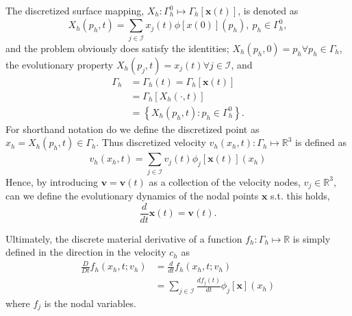 The discretized surface mapping, $X_{h}: \Gamma_{h} ^{0} \mapsto  \Gamma _{h} \left[ \mathbf{x}\left( t \right)  \right] $, is denoted as \[
X_{h}\left( p_{h},t \right) = \sum_{j \in \mathcal{I} }^{}  x_{j}\left( t \right)  \phi \left[ x\left( 0 \right)  \right] \left( p_{h} \right), \  p_{h} \in \Gamma ^{0}_{h},
\]
and the problem obviously does satisfy the identities; $X_{h}\left( p_{h},0 \right)  = p_{h} \forall p_{h} \in \Gamma _{h}$, the evolutionary property $X_{h} \left( p_{j}, t \right)  = x_{j}\left( t \right)  \forall j \in \mathcal{I} $, and
\[
    \begin{split}
        \Gamma _{h} & = \Gamma_{h} \left( t \right) =   \Gamma_{h} \left[ \mathbf{x}\left( t \right)  \right]  \\
                                    &= \Gamma_{h}\left[ X_{h}\left( \cdot ,t \right)  \right] \\
&=\left\{ X_{h}\left( p_{h},t \right): p_{h} \in  \Gamma ^{0}_{h} \right\}.
    \end{split}
\]
For shorthand notation do we define the discretized point as $x_{h} = X_{h}\left( p_{h},t \right) \in \Gamma _{h} $.
Thus discretized velocity $v_{h}\left( x_{h},t \right): \Gamma _{h} \mapsto  \mathbb{R} ^{3} $ is defined as \[
    v_{h}\left( x_{h},t \right)  = \sum_{j \in \mathcal{I} }^{} v_{j}\left( t \right) \phi _{j}\left[ \mathbf{x}\left( t \right)  \right] \left( x_{h} \right)
\]
Hence, by introducing  $\mathbf{v} = \mathbf{v}\left( t \right)  $ as a collection of the velocity nodes,  $v_{j} \in \mathbb{R} ^3$, can we define the evolutionary dynamics of the nodal points $\mathbf{x}$ s.t. this holds,
\[
\frac{d}{dt}\mathbf{x}\left( t \right) = \mathbf{v}\left( t \right).
\]

Ultimately, the discrete material derivative of a function $f_{h}: \Gamma _{h} \mapsto  \mathbb{R} $ is simply defined in the direction in the velocity $c_{h}$  as \[
    \begin{split}
\frac{D}{Dt}f_{h}\left( x_{h}, t; v_{h}   \right) & = \frac{d}{dt} f_{h}\left( x_{h}, t; v_{h}   \right) \\
 & = \sum_{j \in \mathcal{I} }^{} \frac{d f_{j} \left( t \right) }{dt} \phi _{j}\left[ \mathbf{x} \right] \left( x_{h} \right)
    \end{split}
\]
where $f_{j}$ is the nodal variables.

